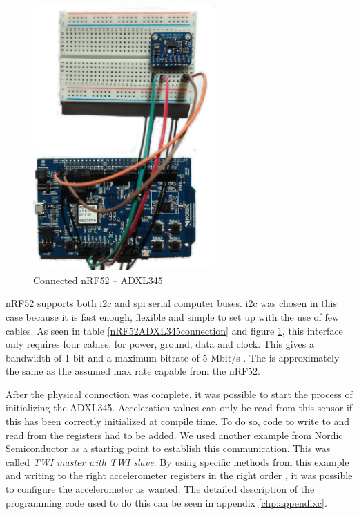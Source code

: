 \begin{figure}[ht]
    \centering
    \includegraphics[width=0.62\textwidth]{connectionADXL-nrf5.png}    
    \caption{Connected nRF52 -- ADXL345}
    \label{fig:nrf-adxl345}
\end{figure}

\newpage

\noindent \gls{nRF52} supports both \gls{i2c} and \gls{spi} serial computer buses. \gls{i2c} was chosen in this case because it is fast enough, flexible and simple to set up with the use of few cables. As seen in table \ref{nRF52ADXL345connection} and figure \ref{fig:nrf-adxl345}, this interface only requires four cables, for power, ground, data and clock. This gives a bandwidth of 1 bit and a maximum bitrate of 5 Mbit/s \cite{semiconductors2000i2c}. The is approximately the same as the assumed max rate capable from the \gls{nRF52}. 

\noindent After the physical connection was complete, it was possible to start the process of initializing the \gls{ADXL345}. Acceleration values can only be read from this sensor if this has been correctly initialized at compile time. To do so, code to write to and read from the registers had to be added. We used another example from Nordic Semiconductor as a starting point to establish this communication. This was called \textit{TWI master with TWI slave}. By using specific methods from this example and writing to the right accelerometer registers in the right order \cite{devices2009digital}, it was possible to configure the accelerometer as wanted. The detailed description of the programming code used to do this can be seen in appendix \ref{chp:appendixc}. 

